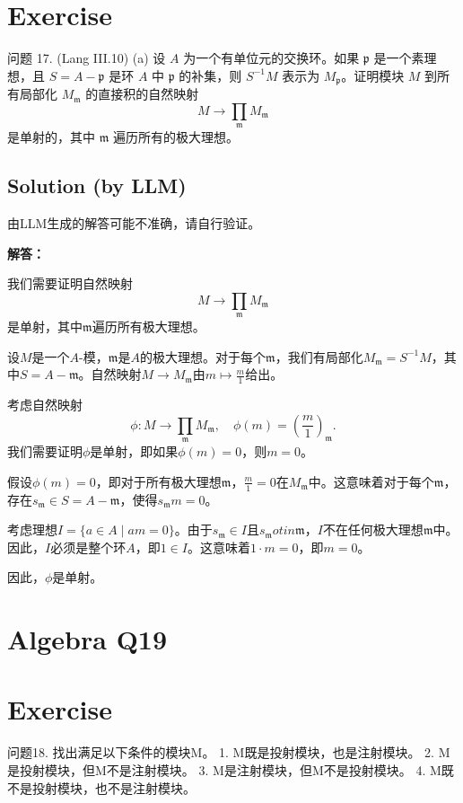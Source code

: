 \documentclass[12pt]{book}
\begin{document}
\section*{Exercise}
问题 17. (Lang III.10) (a) 设 $A$ 为一个有单位元的交换环。如果 $\mathfrak{p}$ 是一个素理想，且 $S = A - \mathfrak{p}$ 是环 $A$ 中 $\mathfrak{p}$ 的补集，则 $S^{-1}M$ 表示为 $M_{\mathfrak{p}}$。证明模块 $M$ 到所有局部化 $M_{\mathfrak{m}}$ 的直接积的自然映射
\[ M \to \prod_{\mathfrak{m}} M_{\mathfrak{m}} \]
是单射的，其中 $\mathfrak{m}$ 遍历所有的极大理想。


\subsection*{Solution (by LLM)}
由LLM生成的解答可能不准确，请自行验证。

\textbf{解答：}

我们需要证明自然映射
\[
M \to \prod_{\mathfrak{m}} M_{\mathfrak{m}}
\]
是单射，其中$\mathfrak{m}$遍历所有极大理想。

设$M$是一个$A$-模，$\mathfrak{m}$是$A$的极大理想。对于每个$\mathfrak{m}$，我们有局部化$M_{\mathfrak{m}} = S^{-1}M$，其中$S = A - \mathfrak{m}$。自然映射$M \to M_{\mathfrak{m}}$由$m \mapsto \frac{m}{1}$给出。

考虑自然映射
\[
\phi: M \to \prod_{\mathfrak{m}} M_{\mathfrak{m}}, \quad \phi(m) = \left( \frac{m}{1} \right)_{\mathfrak{m}}.
\]
我们需要证明$\phi$是单射，即如果$\phi(m) = 0$，则$m = 0$。

假设$\phi(m) = 0$，即对于所有极大理想$\mathfrak{m}$，$\frac{m}{1} = 0$在$M_{\mathfrak{m}}$中。这意味着对于每个$\mathfrak{m}$，存在$s_{\mathfrak{m}} \in S = A - \mathfrak{m}$，使得$s_{\mathfrak{m}} m = 0$。

考虑理想$I = \{ a \in A \mid a m = 0 \}$。由于$s_{\mathfrak{m}} \in I$且$s_{\mathfrak{m}}  otin \mathfrak{m}$，$I$不在任何极大理想$\mathfrak{m}$中。因此，$I$必须是整个环$A$，即$1 \in I$。这意味着$1 \cdot m = 0$，即$m = 0$。

因此，$\phi$是单射。
\newpage
\section{Algebra Q19}
\section*{Exercise}
问题18. 找出满足以下条件的模块M。
1. M既是投射模块，也是注射模块。
2. M是投射模块，但M不是注射模块。
3. M是注射模块，但M不是投射模块。
4. M既不是投射模块，也不是注射模块。
\end{document}
